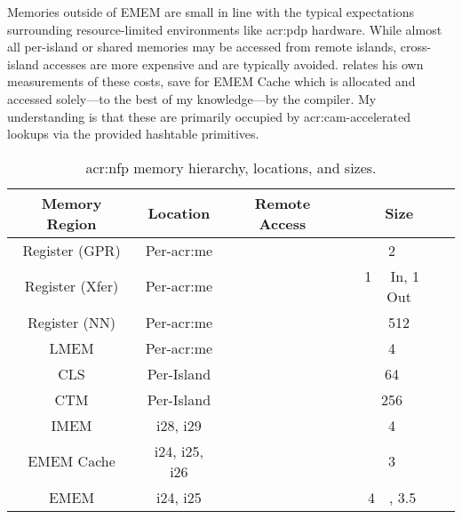 Memories outside of EMEM are small in line with the typical expectations surrounding resource-limited environments like \gls{acr:pdp} hardware.
While almost all per-island or shared memories may be accessed from remote islands, cross-island accesses are more expensive and are typically avoided.
\Textcite[p.~30]{langlet-ml-netronome} relates his own measurements of these costs, save for EMEM Cache which is allocated and accessed solely---to the best of my knowledge---by the compiler.
My understanding is that these are primarily occupied by \gls{acr:cam}-accelerated lookups via the provided hashtable primitives.

\begin{table}
	\centering
	\caption[NFP memory hierarchy, locations, and sizes.]{\gls{acr:nfp} memory hierarchy, locations, and sizes.\label{tab:nfp-adx-mem}}
	\begin{tabular}{@{}cccc@{}}
		\toprule
		Memory Region & Location & Remote Access & Size \\
		\midrule
		Register (GPR) & Per-\gls{acr:me} & \xmark & \qty{2}{\kibi\byte} \\
		Register (Xfer) & Per-\gls{acr:me} & \cmark & \qty{1}{\kibi\byte} In, \qty{1}{\kibi\byte} Out \\
		Register (NN) & Per-\gls{acr:me} & \xmark & \qty{512}{\byte} \\
		LMEM & Per-\gls{acr:me} & \xmark & \qty{4}{\kibi\byte} \\
		CLS & Per-Island & \cmark & \qty{64}{\kibi\byte} \\
		CTM & Per-Island & \cmark & \qty{256}{\kibi\byte} \\
		IMEM & i28, i29 & \cmark & \qty{4}{\mebi\byte} \\
		EMEM Cache & i24, i25, i26 & \cmark& \qty{3}{\mebi\byte} \\
		EMEM & i24, i25 & \cmark & \qty{4}{\gibi\byte}, \qty{3.5}{\gibi\byte}\\
		\bottomrule
	\end{tabular}
\end{table}

